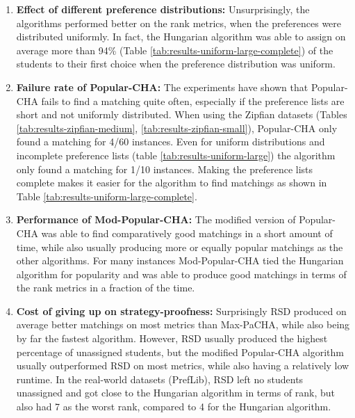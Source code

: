 \begin{enumerate}
  \item \textbf{Effect of different preference distributions:} Unsurprisingly, the algorithms performed better on the rank metrics, when the preferences were distributed uniformly. In fact, the Hungarian algorithm was able to assign on average more than 94\% (Table \ref{tab:results-uniform-large-complete}) of the students to their first choice when the preference distribution was uniform.
  \item \textbf{Failure rate of Popular-CHA:} The experiments have shown that \mbox{Popular-CHA} fails to find a matching quite often, especially if the preference lists are short and not uniformly distributed. When using the Zipfian datasets (Tables \ref{tab:results-zipfian-medium}, \ref{tab:results-zipfian-small}), Popular-CHA only found a matching for 4/60 instances. Even for uniform distributions and incomplete preference lists (table \ref{tab:results-uniform-large}) the algorithm only found a matching for 1/10 instances. Making the preference lists complete makes it easier for the algorithm to find matchings as shown in Table \ref{tab:results-uniform-large-complete}.
  \item \textbf{Performance of Mod-Popular-CHA:} The modified version of Popular-CHA was able to find comparatively good matchings in a short amount of time, while also usually producing more or equally popular matchings as the other algorithms. For many instances Mod-Popular-CHA tied the Hungarian algorithm for popularity and was able to produce good matchings in terms of the rank metrics in a fraction of the time.
  \item \textbf{Cost of giving up on strategy-proofness:} Surprisingly RSD produced on average better matchings on most metrics than Max-PaCHA, while also being by far the fastest algorithm. However, RSD usually produced the highest percentage of unassigned students, but the modified Popular-CHA algorithm usually outperformed RSD on most metrics, while also having a relatively low runtime. In the real-world datasets (PrefLib), RSD left no students unassigned and got close to the Hungarian algorithm in terms of rank, but also had 7 as the worst rank, compared to 4 for the Hungarian algorithm. 

\end{enumerate}
